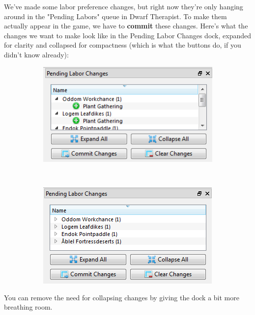 \documentclass[]{article}
\begin{document}
We've made some labor preference changes, but right now they're only hanging around in the "Pending
Labors" queue in Dwarf Therapist. To make them actually appear in the game, we have to \textbf{commit}
these changes. Here's what the changes we want to make look like in the Pending Labor Changes dock,
expanded for clarity and collapsed for compactness (which is what the buttons do, if you didn't know
already):
\vfill
\begin{figure}[h!]
\vspace{-5pt}
        \centering
        \begin{subfigure}[H!]{0.48\textwidth}
                \centering
                \includegraphics[width=\textwidth]{Sec2Fig3-1}
        \end{subfigure}~
        \begin{subfigure}[H!]{0.48\textwidth}
                \centering
                \includegraphics[width=\textwidth]{Sec2Fig3-2}
        \end{subfigure}
\vspace{-5pt}
\end{figure}
You can remove the need for collapsing changes by giving the dock a bit more breathing room.
\vfill
\end{document}
